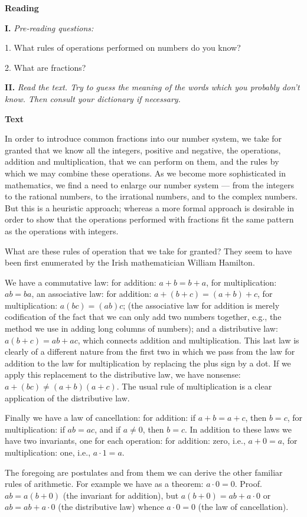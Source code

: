 \documentclass[a4paper]{article}
\newcounter{EUnits}
\newcommand{\EUnit}{\par\medskip{\huge \textbf{Unit \arabic{EUnits}}}\par\stepcounter{EUnits}}
\newcommand{\ESect}[1]{\medskip\par{\large \textbf{#1}}\par}
\newcommand{\ETask}[2]{\medskip\par\textbf{#1.} \textit{#2}\par}
\begin{document}
\EUnit

\ESect{Reading}

\ETask{I}{Pre-reading questions:}
1. What rules of operations performed on numbers do you know?

2. What are fractions?

\ETask{II}{Read the text. Try to guess the meaning of the words which you probably don't know. Then consult your dictionary if
necessary.}

\ESect{Text}

In order to introduce common fractions into our number system, we take for granted that we know all the integers, positive and
negative, the operations, addition and multiplication, that we can perform on them, and the rules by which we may combine
these operations. As we become more sophisticated in mathematics, we find a need to enlarge our number system --- from the
integers to the rational numbers, to the irrational numbers, and to the complex numbers. But this is a heuristic approach;
whereas a more formal approach is desirable in order to show that the operations performed with fractions fit the same
pattern as the operations with integers.

What are these rules of operation that we take for granted? They seem to have been first enumerated by the Irish mathematician
William Hamilton.

We have a commutative law: for addition: $a+b=b+a$, for multiplication: $ab = ba$, an associative law: for addition:
$a+(b+c)=(a+b)+c$, for multiplication: $a(bc)=(ab)c$; (the associative law for addition is merely codification of the
fact that we can only add two numbers together, e.g., the method we use in adding long columns of numbers);
and a distributive law: $a(b+c)=ab+ac$, which connects addition and multiplication. This last law is clearly of a different
nature from the first two in which we pass from the law for addition to the law for multiplication by replacing the plus sign
by a dot. If we apply this replacement to the distributive law, we have nonsense: $a+(bc) \neq (a+b)(a+c)$. The usual rule
of multiplication is a clear application of the distributive law.

Finally we have a law of cancellation: for addition: if $a+b=a+c$, then $b=c$, for multiplication: if $ab = ac$, and if
$a \neq 0$, then $b=c$.
In addition to these laws we have two invariants, one for each operation: for addition: zero, i.e., $a+0=a$, for multiplication:
one, i.e., $a\cdot 1=a$.

The foregoing are postulates and from them we can derive the other familiar rules of arithmetic. For example we have as a
theorem: $a\cdot 0=0$. Proof. $ab = a(b + 0)$ (the invariant for addition), but $a(b + 0) = ab + a\cdot 0$ or $ab=ab+a\cdot 0$
(the distributive law) whence $a \cdot 0=0$ (the law of cancellation).
\end{document}
